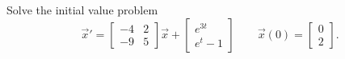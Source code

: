 \documentclass{ximera}
\begin{document}
\begin{exercise}
Solve the initial value problem
\[ 
    {\vec{x}}' = 
    \begin{bmatrix} 
        -4 & 2 \\ 
        -9 & 5 
    \end{bmatrix}
    \vec{x} + 
    \begin{bmatrix} 
        e^{3t} \\ 
        e^t - 1 
    \end{bmatrix} 
    \qquad \vec{x}(0) = 
    \begin{bmatrix} 
        0 \\ 
        2 
    \end{bmatrix}. 
\]
\end{exercise}
\end{document}
